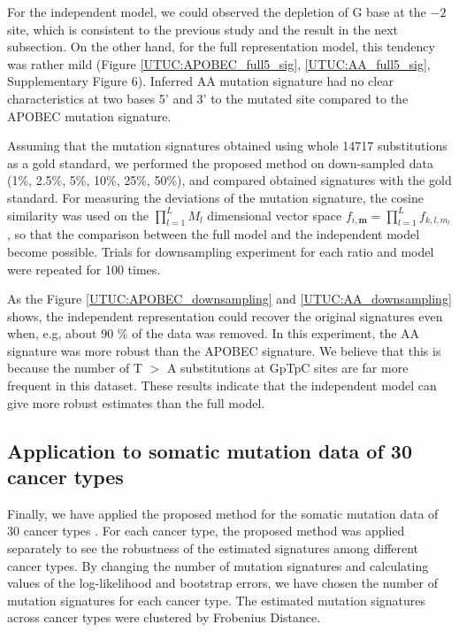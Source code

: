 For the independent model, we could observed the depletion of G base at the $-2$ site,
which is consistent to the previous study \cite{pmid23318258} and the result in the next subsection.
On the other hand, for the full representation model, this tendency was rather mild (Figure \ref{UTUC:APOBEC_full5_sig}, \ref{UTUC:AA_full5_sig}, Supplementary Figure 6).
Inferred AA mutation signature had no clear characteristics at two bases 5' and 3' to the mutated site compared to the APOBEC mutation signature.


Assuming that the mutation signatures obtained using whole 14717 substitutions as a gold standard, 
we performed the proposed method on down-sampled data (1\%, 2.5\%, 5\%, 10\%, 25\%, 50\%), 
and compared obtained signatures with the gold standard.
For measuring the deviations of the mutation signature, the cosine similarity was used on the $\prod_{l=1}^L M_l$ dimensional vector space $f_{i, \bm{m}} = \prod_{l=1}^L f_{k,l,m_l}$,
so that the comparison between the full model and the independent model become possible.
Trials for downsampling experiment for each ratio and model were repeated for 100 times.

As the Figure \ref{UTUC:APOBEC_downsampling} and \ref{UTUC:AA_downsampling} shows, 
the independent representation could recover the original signatures even when, e.g, about 90 \% of the data was removed.
In this experiment, the AA signature was more robust than the APOBEC signature.
We believe that this is because the number of T $>$ A substitutions at GpTpC sites are far more frequent in this dataset.
These results indicate that the independent model can give more robust estimates than the full model.


\subsection*{Application to somatic mutation data of 30 cancer types}
 
Finally, we have applied the proposed method for the somatic mutation data of 30 cancer types \cite{pmid23945592}.
For each cancer type, the proposed method was applied separately to see the robustness of the estimated signatures among different cancer types.
By changing the number of mutation signatures and calculating values of the log-likelihood and bootstrap errors,
we have chosen the number of mutation signatures for each cancer type.
The estimated mutation signatures across cancer types were clustered by Frobenius Distance.



